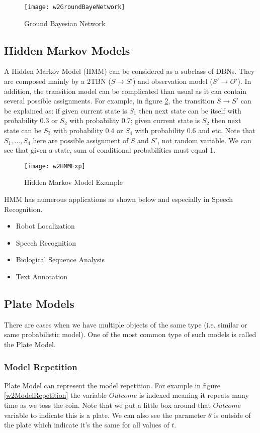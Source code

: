 \begin{figure}[!ht]
	\centering
	\texttt{[image: w2GroundBayeNetwork]}
	\caption{Ground Bayesian Network}
	\label{w2GroundBayeNetwork}
\end{figure}

\subsection{Hidden Markov Models}
A Hidden Markov Model (HMM) can be considered as a subclass of DBNs. They are composed mainly by a 2TBN ($S \rightarrow S'$) and observation model ($S' \rightarrow O'$). In addition, the transition model can be complicated than usual as it can contain several possible assignments. For example, in figure \ref{w2HMMExp}, the transition $S \rightarrow S'$ can be explained as: if given current state is $S_1$ then next state can be itself with probability 0.3 or $S_2$ with probability 0.7; given current state is $S_2$ then next state can be $S_3$ with probability 0.4 or $S_4$ with probability 0.6 and etc. Note that $S_1,...,S_4$ here are possible assignment of $S$ and $S'$, not random variable. We can see that given a state, sum of conditional probabilities must equal 1.

\begin{figure}[!ht]
	\centering
	\texttt{[image: w2HMMExp]}
	\caption{Hidden Markov Model Example}
	\label{w2HMMExp}
\end{figure}

HMM has numerous applications as shown below and especially in Speech Recognition.
\begin{itemize}
	\item Robot Localization
	\item Speech Recognition
	\item Biological Sequence Analysis
	\item Text Annotation
\end{itemize}

\subsection{Plate Models}
There are cases when we have multiple objects of the same type (i.e. similar or same probabilistic model). One of the most common type of such models is called the Plate Model. 
\subsubsection{Model Repetition} 
Plate Model can represent the model repetition. For example in figure \ref{w2ModelRepetition} the variable $Outcome$ is indexed meaning it repeats many time as we toss the coin. Note that we put a little box around that $Outcome$ variable to indicate this is a plate. We can also see the parameter $\theta$ is outside of the plate which indicate it's the same for all values of $t$. 

